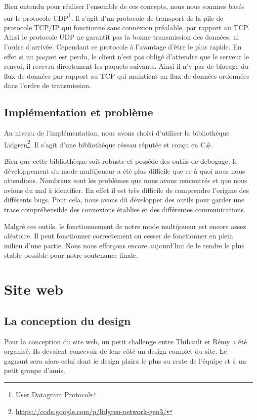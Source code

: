 \documentclass[11pt]{report}
\begin{document}
Bien entendu pour réaliser l'ensemble de ces concepts, nous nous sommes basés sur le protocole UDP\footnote{User Datagram Protocol}. Il s'agit d'un protocole de transport de la pile de protocole TCP/IP qui fonctionne sans connexion préalable, par rapport au TCP. Ainsi le protocole UDP ne garantit pas la bonne transmission des données, ni l'ordre d'arrivée. Cependant ce protocole à l'avantage d'être le plus rapide. En effet si un paquet est perdu, le client n'est pas obligé d'attendre que le serveur le renvoi, il recevra directement les paquets suivants. Ainsi il n'y pas de blocage du flux de données par rapport au TCP qui maintient un flux de données ordonnées dans l'ordre de transmission.

\section{Implémentation et problème}

Au niveau de l'implémentation, nous avons choisi d'utiliser la bibliothèque Lidgren\footnote{\url{https://code.google.com/p/lidgren-network-gen3/}}. Il s'agit d'une bibliothèque réseau réputée et conçu en C\#.

Bien que cette bibliothèque soit robuste et possède des outils de debogage, le développement du mode multijoueur a été plus difficile que ce à quoi nous nous attendions. Nombreux sont les problèmes que nous avons rencontrés et que nous avions du mal à identifier. En effet il est très difficile de comprendre l'origine des différents bugs. Pour cela, nous avons dû développer des outils pour garder une trace compréhensible des connexions établies et des différentes communications.

Malgré ces outils, le fonctionnement de notre mode multijoueur est encore assez aléatoire. Il peut fonctionner correctement ou cesser de fonctionner en plein milieu d'une partie. Nous nous efforçons encore aujourd'hui de le rendre le plus stable possible pour notre soutenance finale.

\chapter{Site web}

\section{La conception du design}

Pour la conception du site web, un petit challenge entre Thibault et Rémy a été organisé. Ils devaient concevoir de leur côté un design complet du site. Le gagnant sera alors celui dont le design plaira le plus au reste de l'équipe et à un petit groupe d'amis.
\end{document}
